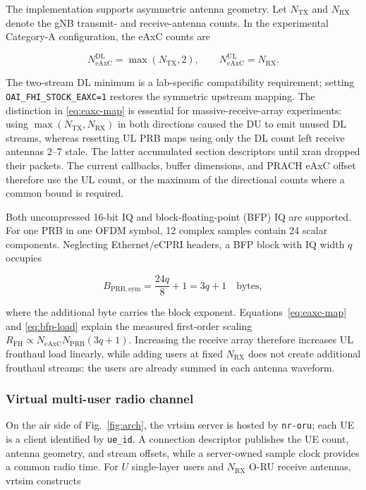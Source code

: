 \documentclass[11pt,a4paper]{article}
\begin{document}
The implementation supports asymmetric antenna geometry.  Let $N_{\mathrm{TX}}$ and
$N_{\mathrm{RX}}$ denote the gNB transmit- and receive-antenna counts.  In the experimental
Category-A configuration, the eAxC counts are

\begin{equation}
  N_{\mathrm{eAxC}}^{\mathrm{DL}}=\max(N_{\mathrm{TX}},2), \qquad
  N_{\mathrm{eAxC}}^{\mathrm{UL}}=N_{\mathrm{RX}}.
  \label{eq:eaxc-map}
\end{equation}

The two-stream DL minimum is a lab-specific compatibility requirement; setting
\texttt{OAI\_FHI\_STOCK\_EAXC=1} restores the symmetric upstream mapping.  The distinction in
\eqref{eq:eaxc-map} is essential for massive-receive-array experiments: using
$\max(N_{\mathrm{TX}},N_{\mathrm{RX}})$ in both directions caused the DU to emit unused DL
streams, whereas resetting UL PRB maps using only the DL count left receive antennas 2--7
stale.  The latter accumulated section descriptors until xran dropped their packets.  The
current callbacks, buffer dimensions, and PRACH eAxC offset therefore use the UL count, or the
maximum of the directional counts where a common bound is required.

Both uncompressed 16-bit IQ and block-floating-point (BFP) IQ are supported.  For one PRB in
one OFDM symbol, 12 complex samples contain 24 scalar components.  Neglecting Ethernet/eCPRI
headers, a BFP block with IQ width $q$ occupies

\begin{equation}
  B_{\mathrm{PRB,sym}} = \frac{24q}{8}+1 = 3q+1 \quad \text{bytes},
  \label{eq:bfp-load}
\end{equation}

where the additional byte carries the block exponent.  Equations~\eqref{eq:eaxc-map} and
\eqref{eq:bfp-load} explain the measured first-order scaling
$R_{\mathrm{FH}}\propto N_{\mathrm{eAxC}}N_{\mathrm{PRB}}(3q+1)$.  Increasing the receive
array therefore increases UL fronthaul load linearly, while adding users at fixed
$N_{\mathrm{RX}}$ does not create additional fronthaul streams: the users are already summed
in each antenna waveform.

\subsubsection{Virtual multi-user radio channel}

On the air side of Fig.~\ref{fig:arch}, the vrtsim server is hosted by \texttt{nr-oru}; each UE
is a client identified by \texttt{ue\_id}.  A connection descriptor publishes the UE count,
antenna geometry, and stream offsets, while a server-owned sample clock provides a common radio
time.  For $U$ single-layer users and $N_{\mathrm{RX}}$ O-RU receive antennas, vrtsim constructs
\end{document}
